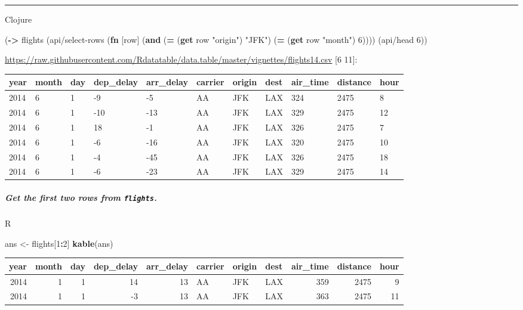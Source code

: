 \documentclass[]{article}
\newenvironment{Shaded}{\begin{snugshade}}{\end{snugshade}}
\newcommand{\KeywordTok}[1]{\textcolor[rgb]{0.13,0.29,0.53}{\textbf{#1}}}
\newcommand{\DecValTok}[1]{\textcolor[rgb]{0.00,0.00,0.81}{#1}}
\newcommand{\StringTok}[1]{\textcolor[rgb]{0.31,0.60,0.02}{#1}}
\newcommand{\OperatorTok}[1]{\textcolor[rgb]{0.81,0.36,0.00}{\textbf{#1}}}
\newcommand{\NormalTok}[1]{#1}
\let\oldsubparagraph\subparagraph
\renewcommand{\subparagraph}[1]{\oldsubparagraph{#1}\mbox{}}
\begin{document}
\begin{center}\rule{0.5\linewidth}{0.5pt}\end{center}

Clojure

\begin{Shaded}
\begin{Highlighting}[]
\NormalTok{(}\KeywordTok{->}\NormalTok{ flights}
\NormalTok{    (api/select-rows (}\KeywordTok{fn}\NormalTok{ [row] (}\KeywordTok{and}\NormalTok{ (}\KeywordTok{=}\NormalTok{ (}\KeywordTok{get}\NormalTok{ row }\StringTok{"origin"}\NormalTok{) }\StringTok{"JFK"}\NormalTok{)}
\NormalTok{                                   (}\KeywordTok{=}\NormalTok{ (}\KeywordTok{get}\NormalTok{ row }\StringTok{"month"}\NormalTok{) }\DecValTok{6}\NormalTok{))))}
\NormalTok{    (api/head }\DecValTok{6}\NormalTok{))}
\end{Highlighting}
\end{Shaded}

\url{https://raw.githubusercontent.com/Rdatatable/data.table/master/vignettes/flights14.csv}
{[}6 11{]}:

\begin{longtable}[]{@{}lllllllllll@{}}
\toprule
year & month & day & dep\_delay & arr\_delay & carrier & origin & dest &
air\_time & distance & hour\tabularnewline
\midrule
\endhead
2014 & 6 & 1 & -9 & -5 & AA & JFK & LAX & 324 & 2475 & 8\tabularnewline
2014 & 6 & 1 & -10 & -13 & AA & JFK & LAX & 329 & 2475 &
12\tabularnewline
2014 & 6 & 1 & 18 & -1 & AA & JFK & LAX & 326 & 2475 & 7\tabularnewline
2014 & 6 & 1 & -6 & -16 & AA & JFK & LAX & 320 & 2475 &
10\tabularnewline
2014 & 6 & 1 & -4 & -45 & AA & JFK & LAX & 326 & 2475 &
18\tabularnewline
2014 & 6 & 1 & -6 & -23 & AA & JFK & LAX & 329 & 2475 &
14\tabularnewline
\bottomrule
\end{longtable}

\subparagraph{\texorpdfstring{Get the first two rows from
\texttt{flights}.}{Get the first two rows from flights.}}\label{get-the-first-two-rows-from-flights.}

R

\begin{Shaded}
\begin{Highlighting}[]
\NormalTok{ans <-}\StringTok{ }\NormalTok{flights[}\DecValTok{1}\OperatorTok{:}\DecValTok{2}\NormalTok{]}
\KeywordTok{kable}\NormalTok{(ans)}
\end{Highlighting}
\end{Shaded}

\begin{longtable}[]{@{}rrrrrlllrrr@{}}
\toprule
year & month & day & dep\_delay & arr\_delay & carrier & origin & dest &
air\_time & distance & hour\tabularnewline
\midrule
\endhead
2014 & 1 & 1 & 14 & 13 & AA & JFK & LAX & 359 & 2475 & 9\tabularnewline
2014 & 1 & 1 & -3 & 13 & AA & JFK & LAX & 363 & 2475 & 11\tabularnewline
\bottomrule
\end{longtable}
\end{document}
